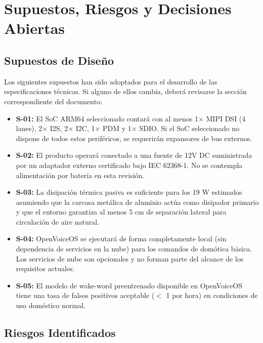 \documentclass[%
	paper=a4,
	twoside=false,
	parskip=half,
	chapterprefix=false,
	10pt,
	headings=normal,
	bibliography=totoc,
	listof=totoc,
	titlepage=on,
	captions=tableabove,
	draft=false, 
]{scrbook}%
\begin{document}
\chapter{Supuestos, Riesgos y Decisiones Abiertas}
\label{chap:supuestos}

\section{Supuestos de Diseño}

Los siguientes supuestos han sido adoptados para el desarrollo de las especificaciones técnicas. Si alguno de ellos cambia, deberá revisarse la sección correspondiente del documento:

\begin{itemize}
    \item \textbf{S-01:} El SoC ARM64 seleccionado contará con al menos 1$\times$ MIPI DSI (4 lanes), 2$\times$ I2S, 2$\times$ I2C, 1$\times$ PDM y 1$\times$ SDIO. Si el SoC seleccionado no dispone de todos estos periféricos, se requerirán expansores de bus externos.
    \item \textbf{S-02:} El producto operará conectado a una fuente de 12V DC suministrada por un adaptador externo certificado bajo IEC 62368-1. No se contempla alimentación por batería en esta revisión.
    \item \textbf{S-03:} La disipación térmica pasiva es suficiente para los 19 W estimados asumiendo que la carcasa metálica de aluminio actúa como disipador primario y que el entorno garantiza al menos 5 cm de separación lateral para circulación de aire natural.
    \item \textbf{S-04:} OpenVoiceOS se ejecutará de forma completamente local (sin dependencia de servicios en la nube) para los comandos de domótica básica. Los servicios de nube son opcionales y no forman parte del alcance de los requisitos actuales.
    \item \textbf{S-05:} El modelo de wake-word preentrenado disponible en OpenVoiceOS tiene una tasa de falsos positivos aceptable ($<$ 1 por hora) en condiciones de uso doméstico normal.
\end{itemize}

\section{Riesgos Identificados}
\end{document}
